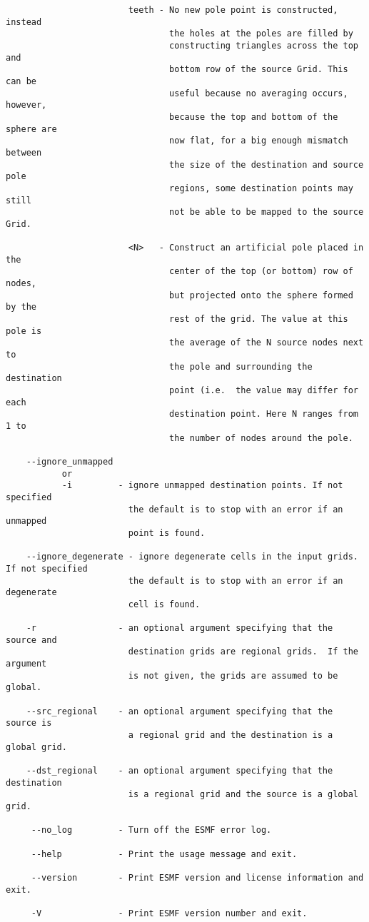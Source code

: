 \begin{verbatim}
                        teeth - No new pole point is constructed, instead
                                the holes at the poles are filled by
                                constructing triangles across the top and
                                bottom row of the source Grid. This can be
                                useful because no averaging occurs, however,
                                because the top and bottom of the sphere are
                                now flat, for a big enough mismatch between
                                the size of the destination and source pole
                                regions, some destination points may still
                                not be able to be mapped to the source Grid.

                        <N>   - Construct an artificial pole placed in the
                                center of the top (or bottom) row of nodes,
                                but projected onto the sphere formed by the
                                rest of the grid. The value at this pole is
                                the average of the N source nodes next to
                                the pole and surrounding the destination
                                point (i.e.  the value may differ for each
                                destination point. Here N ranges from 1 to
                                the number of nodes around the pole.

    --ignore_unmapped
           or
           -i         - ignore unmapped destination points. If not specified
                        the default is to stop with an error if an unmapped
                        point is found.

    --ignore_degenerate - ignore degenerate cells in the input grids. If not specified
                        the default is to stop with an error if an degenerate
                        cell is found.

    -r                - an optional argument specifying that the source and
                        destination grids are regional grids.  If the argument
                        is not given, the grids are assumed to be global.

    --src_regional    - an optional argument specifying that the source is
                        a regional grid and the destination is a global grid.

    --dst_regional    - an optional argument specifying that the destination
                        is a regional grid and the source is a global grid.

     --no_log         - Turn off the ESMF error log.

     --help           - Print the usage message and exit.

     --version        - Print ESMF version and license information and exit.

     -V               - Print ESMF version number and exit.
\end{verbatim}


